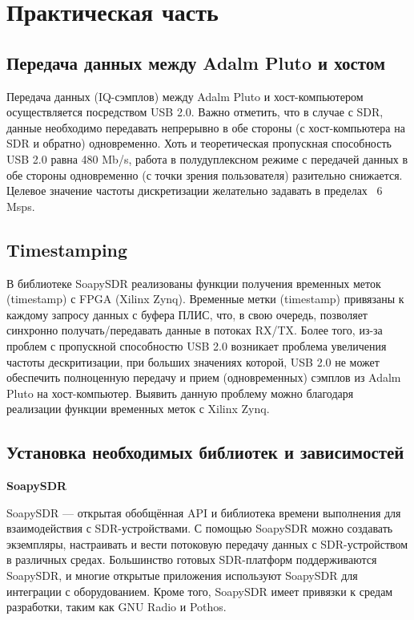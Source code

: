 \chapter{Практическая часть}
\label{ch:chap2}

\section*{\textbf{Передача данных между Adalm Pluto и хостом}}

Передача данных (IQ-сэмплов) между Adalm Pluto и хост-компьютером осуществляется посредством USB 2.0. Важно отметить, 
что в случае с SDR, данные необходимо передавать непрерывно в обе стороны (с хост-компьютера на SDR и обратно) одновременно. 
Хоть и теоретическая пропускная способность USB 2.0 равна 480 Mb/s, работа в полудуплексном режиме с передачей данных в 
обе стороны одновременно (с точки зрения пользователя) разительно снижается. Целевое значение частоты дискретизации 
желательно задавать в пределах ~6 Msps.

\section*{\textbf{Timestamping}}

В библиотеке SoapySDR реализованы функции получения временных меток (timestamp) с FPGA (Xilinx Zynq). Временные метки (timestamp) привязаны к каждому запросу 
данных с буфера ПЛИС, что, в свою очередь, позволяет синхронно получать/передавать данные в потоках RX/TX. Более того, 
из-за проблем с пропускной способностю USB 2.0 возникает проблема увеличения частоты дескритизации, при больших значениях которой,
USB 2.0 не может обеспечить полноценную передачу и прием (одновременных) сэмплов из Adalm Pluto на хост-компьютер. 
Выявить данную проблему можно благодаря реализации функции временных меток с Xilinx Zynq.

\section*{\textbf{Установка необходимых библиотек и зависимостей}}

\textbf{SoapySDR}

SoapySDR — открытая обобщённая API и библиотека времени выполнения для взаимодействия с SDR-устройствами. 
С помощью SoapySDR можно создавать экземпляры, настраивать и вести потоковую передачу данных с SDR-устройством в различных средах.
Большинство готовых SDR-платформ поддерживаются SoapySDR, и многие открытые приложения используют SoapySDR для интеграции с 
оборудованием. Кроме того, SoapySDR имеет привязки к средам разработки, таким как GNU Radio и Pothos.

